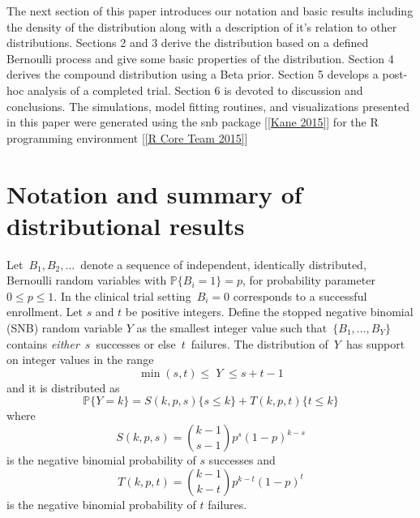 \documentclass[12pt]{article}         %
\begin{document}
The next section of this paper introduces our notation and basic results 
including the density of the distribution along with a description of 
it's relation to other distributions. Sections 2 and 3 derive the distribution 
based on a defined Bernoulli process and give some basic properties of the 
distribution. Section 4 derives the compound distribution using a Beta prior. 
Section 5 develops a post-hoc analysis of a completed trial. Section 6 is 
devoted to discussion and conclusions. The simulations, model fitting 
routines, and visualizations presented in this paper were generated using the 
snb package [\ref{Kane 2015}] for the R programming 
environment [\ref{R Core Team 2015}]



\section   {Notation and summary of distributional results}
\label{notation.section}

Let $\,B_1, B_2, \ldots \,$ denote a sequence of independent, identically 
distributed, Bernoulli random variables with $\mathbb{P}\{B_i=1\}=p$, for 
probability parameter $0\leq p \leq 1$. In the clinical trial setting 
$\,B_i = 0$ corresponds to a successful enrollment. 
Let $s$ and $t$ be positive integers. 
Define the stopped negative binomial (SNB) random variable $Y$ as the smallest 
integer value such that $\,\{B_1, \ldots , B_Y\}\,$ contains {\em either} 
$\,s\,$ successes or else $\,t\,$ failures. The distribution of $\,Y\,$ has 
support on integer values in the range 
\begin{equation*}                                     %
     \min(s,t) \leq \; Y \;\leq s+t-1  \label{range.y.eq}
\end{equation*}
and it is distributed as
\begin{equation} \label{eqn:pmf}
\mathbb{P}\{Y=k\} = S(k, p, s)  \{s \leq k\} + T(k, p, t) \{t \leq k \} 
\end{equation}
where
\begin{equation} \label{eqn:N}
S(k, p, s) = {k-1 \choose s-1} p^s (1-p)^{k-s} 
\end{equation}
is the negative binomial probability of $s$ successes and
\begin{equation} \label{eqn:R}
T(k, p, t) = {k-1 \choose k-t} p^{k-t} (1-p)^t
\end{equation}
is the negative binomial probability of $t$ failures.
\end{document}

